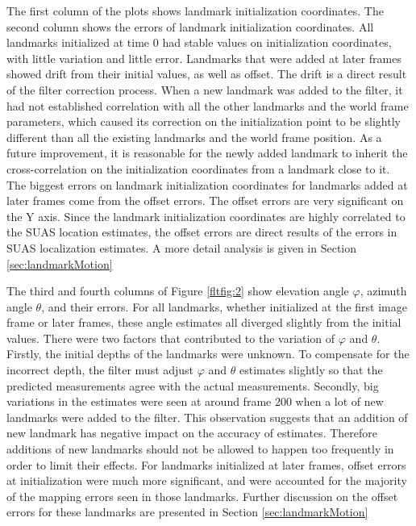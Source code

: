 The first column of the plots shows landmark initialization
coordinates. The second column shows the errors of landmark
initialization coordinates. All landmarks initialized at time 0 had
stable values on initialization coordinates, with little variation and
little error. Landmarks that were added at later frames showed drift
from their initial values, as well as offset. The drift is a direct
result of the filter correction process. When a new landmark was added
to the filter, it had not established correlation with all the other
landmarks and the world frame parameters, which caused its correction
on the initialization point to be slightly different than all the
existing landmarks and the world frame position. As a future
improvement, it is reasonable for the newly added landmark to inherit
the cross-correlation on the initialization coordinates from a
landmark close to it. The biggest errors on landmark initialization
coordinates for landmarks added at later frames come from the offset
errors. The offset errors are very significant on the Y axis. Since
the landmark initialization coordinates are highly correlated to the
SUAS location estimates, the offset errors are direct results of the
errors in SUAS localization estimates. A more detail analysis is given
in Section \ref{sec:landmarkMotion}

The third and fourth columns of Figure \ref{fltfig:2} show elevation
angle $\varphi$, azimuth angle $\theta$, and their errors. For all
landmarks, whether initialized at the first image frame or later frames,
these angle estimates all diverged slightly from the initial values.
There were two factors that contributed to the variation of $\varphi$
and $\theta$. Firstly, the initial depths of the landmarks were
unknown. To compensate for the incorrect depth, the filter must adjust
$\varphi$ and $\theta$ estimates slightly so that the predicted
measurements agree with the actual measurements. Secondly, big
variations in the estimates were seen at around frame 200 when a lot
of new landmarks were added to the filter. This observation suggests
that an addition of new landmark has negative impact on the accuracy of
estimates. Therefore additions of new landmarks should not be allowed
to happen too frequently in order to limit their effects. For
landmarks initialized at later frames, offset errors at initialization
were much more significant, and were accounted for the majority of the
mapping errors seen in those landmarks. Further discussion on the offset
errors for these landmarks are presented in Section
\ref{sec:landmarkMotion}

